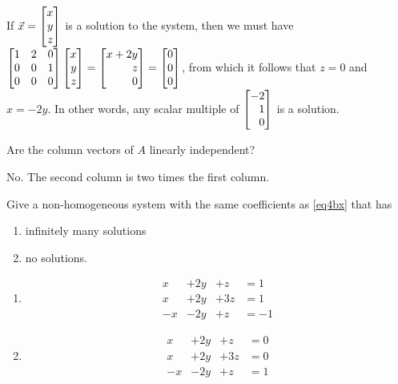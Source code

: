 \documentclass{workbook}
\begin{document}
\begin{slide}
\begin{parts}
\begin{solution}
				If $\vec x=\mat{x\\y\\z}$ is a solution to the system, then we
				must have $\mat{1&2&0\\0&0&1\\0&0&0}\mat{x\\y\\z}=\mat{x+2y\\z\\0}=\mat{0\\0\\0}$,
				from which it follows that $z=0$ and $x=-2y$. In other words,
				any scalar multiple of $\mat{-2\\1\\0}$ is a solution.
			\end{solution}
		\item Are the column vectors of $A$ linearly independent?
			\begin{solution}
				No. The second column is two times the first column.
			\end{solution}
		\item Give a non-homogeneous system with the same coefficients as \eqref{eq4bx} that has
			\begin{enumerate}
				\item infinitely many solutions
				\item no solutions.
			\end{enumerate}
			\begin{solution}
				\begin{enumerate}
					\item
						\begin{equation*}
							\begin{array}{llll}
								x&+2y&+z &= 1\\
								x&+2y&+3z &= 1\\
								-x&-2y&+z &= -1
							\end{array}
						\end{equation*}
					\item
						\begin{equation*}
							\begin{array}{llll}
								x&+2y&+z &= 0\\
								x&+2y&+3z &= 0\\
								-x&-2y&+z &= 1
							\end{array}
						\end{equation*}
				\end{enumerate}
			\end{solution}
	\end{parts}
\end{slide}
\end{document}
